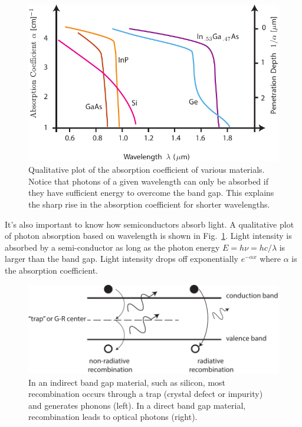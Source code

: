 \begin{figure}[tb]
\centering
\includegraphics[width=.75\columnwidth]{semi_absorb_photon}
\caption{Qualitative plot of the absorption coefficient of various materials.  Notice that photons of a given wavelength can only be absorbed if they have sufficient energy to overcome the band gap.  This explains the sharp rise in the absorption coefficient for shorter wavelengths.} \label{fig:semi_absorb_photon}
\end{figure}
It's also important to know how semiconductors absorb light.  A qualitative plot of photon absorption based on wavelength is shown in Fig.~\ref{fig:semi_absorb_photon}.  Light intensity is absorbed by a semi-conductor as long as the photon energy $E = h\nu = hc/\lambda $ is larger than the band gap.   Light intensity drops off exponentially $e^{-\alpha x}$ where $\alpha$ is the absorption coefficient.  
\begin{figure}[tb]
\centering
\includegraphics[width=.75\columnwidth]{rad_vs_nonrad_reco}
\caption{In an indirect band gap material, such as silicon, most recombination occurs through a trap (crystal defect or impurity) and generates phonons (left).  In a direct band gap material, recombination leads to optical photons (right).}
\label{fig:rad_vs_nonrad_reco}
\end{figure}
